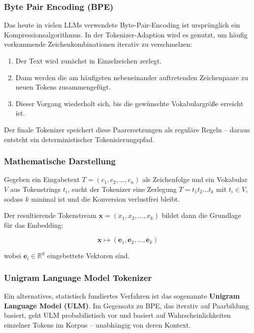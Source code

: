 \subsubsection{Byte Pair Encoding (BPE)}

Das heute in vielen LLMs verwendete Byte-Pair-Encoding ist ursprünglich ein Kompressionsalgorithmus. In der Tokenizer-Adaption wird es genutzt, um häufig vorkommende Zeichenkombinationen iterativ zu verschmelzen:

\begin{enumerate}
  \item Der Text wird zunächst in Einzelzeichen zerlegt.
  \item Dann werden die am häufigsten nebeneinander auftretenden Zeichenpaare zu neuen Tokens zusammengefügt.
  \item Dieser Vorgang wiederholt sich, bis die gewünschte Vokabulargröße erreicht ist.
\end{enumerate}

Der finale Tokenizer speichert diese Paarersetzungen als reguläre Regeln – daraus entsteht ein deterministischer Tokenisierungspfad.

\subsubsection{Mathematische Darstellung}

Gegeben ein Eingabetext $T = (c_1, c_2, ..., c_n)$ als Zeichenfolge und ein Vokabular $V$ aus Tokenstrings $t_i$, sucht der Tokenizer eine Zerlegung $T = t_1 t_2 ... t_k$ mit $t_i \in V$, sodass $k$ minimal ist und die Konversion verlustfrei bleibt.

Der resultierende Tokenstream $\mathbf{x} = (x_1, x_2, ..., x_k)$ bildet dann die Grundlage für das Embedding:

\[
\mathbf{x} \mapsto (\mathbf{e}_1, \mathbf{e}_2, ..., \mathbf{e}_k)
\]

wobei $\mathbf{e}_i \in \mathbb{R}^d$ eingebettete Vektoren sind.

\subsubsection{Unigram Language Model Tokenizer}

Ein alternatives, statistisch fundiertes Verfahren ist das sogenannte \textbf{Unigram Language Model (ULM)}. Im Gegensatz zu BPE, das iterativ auf Paarbildung basiert, geht ULM probabilistisch vor und basiert auf Wahrscheinlichkeiten einzelner Tokens im Korpus – unabhängig von deren Kontext.

